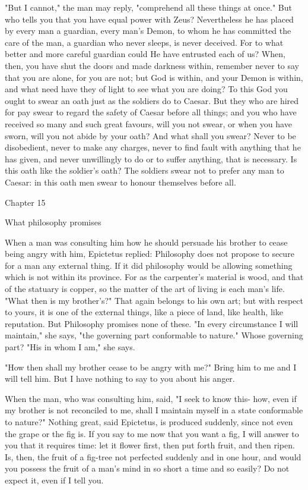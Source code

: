 \documentclass[a4paper]{article}
\begin{document}
"But I cannot," the man may reply, "comprehend all these things at
once." But who tells you that you have equal power with Zeus? Nevertheless
he has placed by every man a guardian, every man's Demon, to whom
he has committed the care of the man, a guardian who never sleeps,
is never deceived. For to what better and more careful guardian could
He have entrusted each of us? When, then, you have shut the doors
and made darkness within, remember never to say that you are alone,
for you are not; but God is within, and your Demon is within, and
what need have they of light to see what you are doing? To this God
you ought to swear an oath just as the soldiers do to Caesar. But
they who are hired for pay swear to regard the safety of Caesar before
all things; and you who have received so many and such great favours,
will you not swear, or when you have sworn, will you not abide by
your oath? And what shall you swear? Never to be disobedient, never
to make any charges, never to find fault with anything that he has
given, and never unwillingly to do or to suffer anything, that is
necessary. Is this oath like the soldier's oath? The soldiers swear
not to prefer any man to Caesar: in this oath men swear to honour
themselves before all. 

Chapter 15

What philosophy promises 

When a man was consulting him how he should persuade his brother to
cease being angry with him, Epictetus replied: Philosophy does not
propose to secure for a man any external thing. If it did philosophy
would be allowing something which is not within its province. For
as the carpenter's material is wood, and that of the statuary is copper,
so the matter of the art of living is each man's life. "What then
is my brother's?" That again belongs to his own art; but with respect
to yours, it is one of the external things, like a piece of land,
like health, like reputation. But Philosophy promises none of these.
"In every circumstance I will maintain," she says, "the governing
part conformable to nature." Whose governing part? "His in whom I
am," she says. 

"How then shall my brother cease to be angry with me?" Bring him to
me and I will tell him. But I have nothing to say to you about his
anger. 

When the man, who was consulting him, said, "I seek to know this-
how, even if my brother is not reconciled to me, shall I maintain
myself in a state conformable to nature?" Nothing great, said Epictetus,
is produced suddenly, since not even the grape or the fig is. If you
say to me now that you want a fig, I will answer to you that it requires
time: let it flower first, then put forth fruit, and then ripen. Is,
then, the fruit of a fig-tree not perfected suddenly and in one hour,
and would you possess the fruit of a man's mind in so short a time
and so easily? Do not expect it, even if I tell you. 
\end{document}
